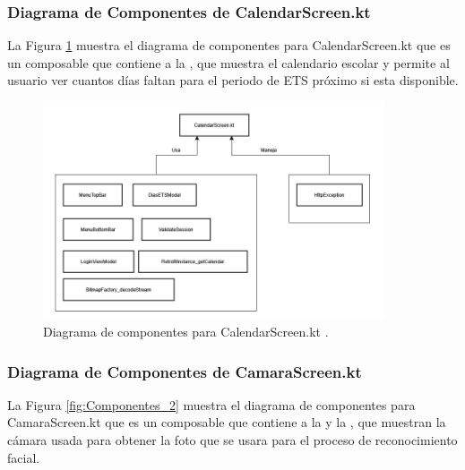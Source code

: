 \newpage

\subsubsection{Diagrama de Componentes de CalendarScreen.kt}

La Figura \ref{fig:Componentes_1} muestra el diagrama de componentes para CalendarScreen.kt que es un composable que contiene a la , que muestra el calendario escolar y permite al usuario ver cuantos días faltan para el periodo de ETS próximo si esta disponible.

\begin{figure}[htbp!]
	\begin{center}
		\includegraphics[width=0.9\textwidth]{DiagramasMoviles/DCM (13)}
		\caption{Diagrama de componentes para CalendarScreen.kt .}
		\label{fig:Componentes_1}
	\end{center}
\end{figure}

\newpage

\subsubsection{Diagrama de Componentes de CamaraScreen.kt}

La Figura \ref{fig:Componentes_2} muestra el diagrama de componentes para CamaraScreen.kt que es un composable que contiene a la  y la , que muestran la cámara usada para obtener la foto que se usara para el proceso de reconocimiento facial.

